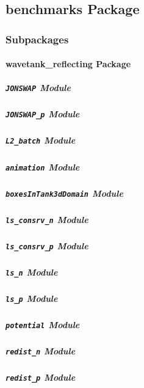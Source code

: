\documentclass[letterpaper,12pt,english]{sphinxmanual}
\begin{document}
\subsection{benchmarks Package}
\label{api/benchmarks:benchmarks-package}\label{api/benchmarks::doc}

\subsubsection{Subpackages}
\label{api/benchmarks:subpackages}

\paragraph{wavetank\_reflecting Package}
\label{api/benchmarks.wavetank_reflecting::doc}\label{api/benchmarks.wavetank_reflecting:wavetank-reflecting-package}

\subparagraph{\texttt{JONSWAP} Module}
\label{api/benchmarks.wavetank_reflecting:jonswap-module}

\subparagraph{\texttt{JONSWAP\_p} Module}
\label{api/benchmarks.wavetank_reflecting:jonswap-p-module}

\subparagraph{\texttt{L2\_batch} Module}
\label{api/benchmarks.wavetank_reflecting:l2-batch-module}

\subparagraph{\texttt{animation} Module}
\label{api/benchmarks.wavetank_reflecting:animation-module}

\subparagraph{\texttt{boxesInTank3dDomain} Module}
\label{api/benchmarks.wavetank_reflecting:boxesintank3ddomain-module}

\subparagraph{\texttt{ls\_consrv\_n} Module}
\label{api/benchmarks.wavetank_reflecting:ls-consrv-n-module}

\subparagraph{\texttt{ls\_consrv\_p} Module}
\label{api/benchmarks.wavetank_reflecting:ls-consrv-p-module}

\subparagraph{\texttt{ls\_n} Module}
\label{api/benchmarks.wavetank_reflecting:ls-n-module}

\subparagraph{\texttt{ls\_p} Module}
\label{api/benchmarks.wavetank_reflecting:ls-p-module}

\subparagraph{\texttt{potential} Module}
\label{api/benchmarks.wavetank_reflecting:potential-module}

\subparagraph{\texttt{redist\_n} Module}
\label{api/benchmarks.wavetank_reflecting:redist-n-module}

\subparagraph{\texttt{redist\_p} Module}
\label{api/benchmarks.wavetank_reflecting:redist-p-module}
\end{document}
